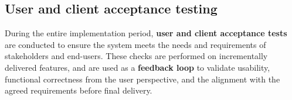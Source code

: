 \subsection{User and client acceptance testing}
\label{subsec:acceptance_tests}%

During the entire implementation period, \textbf{user and client acceptance tests} are conducted to ensure the system meets the needs and requirements of stakeholders and end-users. These checks are performed on incrementally delivered features, and are used as a \textbf{feedback loop} to validate usability, functional correctness from the user perspective, and the alignment with the agreed requirements before final delivery.
